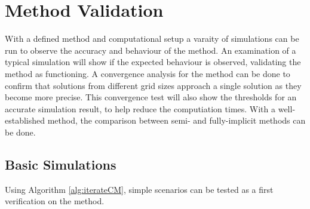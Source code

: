 \section{Method Validation}

  With a defined method and computational setup a varaity of simulations can be run to observe the accuracy and behaviour of the method.
  An examination of a typical simulation will show if the expected behaviour is observed, validating the method as functioning.
  A convergence analysis for the method can be done to confirm that solutions from different grid sizes approach a single solution as they become more precise.
  This convergence test will also show the thresholds for an accurate simulation result, to help reduce the computiation times.
  With a well-established method, the comparison between semi- and fully-implicit methods can be done.

\subsection{Basic Simulations}

  Using Algorithm \ref{alg:iterateCM}, simple scenarios can be tested as a first verification on the method.

  

